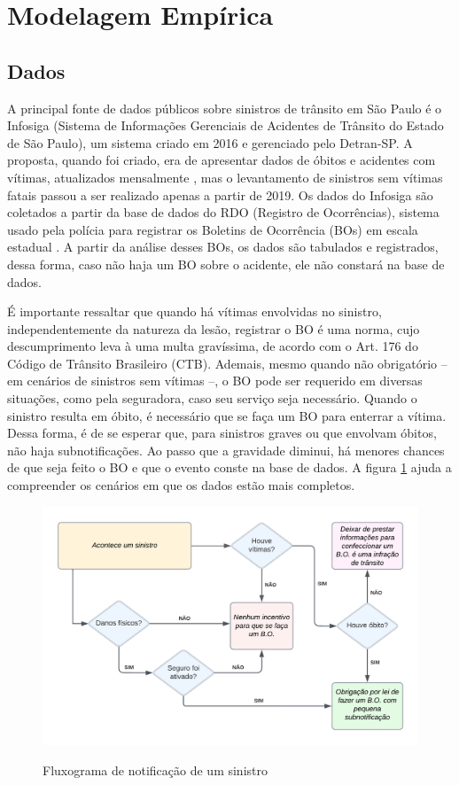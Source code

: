 \section{Modelagem Empírica}
\label{sec:modemp}

\subsection{Dados}

A principal fonte de dados públicos sobre sinistros de trânsito em São Paulo é o Infosiga (Sistema de Informações Gerenciais de Acidentes de Trânsito do Estado de São Paulo), um sistema criado em 2016 e gerenciado pelo Detran-SP. A proposta, quando foi criado, era de apresentar dados de óbitos e acidentes com vítimas, atualizados mensalmente \cite{Res_SG-6_de_23-2-2016}, mas o levantamento de sinistros sem vítimas fatais passou a ser realizado apenas a partir de 2019. Os dados do Infosiga são coletados a partir da base de dados do RDO (Registro de Ocorrências), sistema usado pela polícia para registrar os Boletins de Ocorrência (BOs) em escala estadual \cite{plano_segviar}. A partir da análise desses BOs, os dados são tabulados e registrados, dessa forma, caso não haja um BO sobre o acidente, ele não constará na base de dados. 

É importante ressaltar que quando há vítimas envolvidas no sinistro, independentemente da natureza da lesão, registrar o BO é uma norma, cujo descumprimento leva à uma multa gravíssima, de acordo com o Art. 176 do Código de Trânsito Brasileiro (CTB). Ademais, mesmo quando não obrigatório -- em cenários de sinistros sem vítimas --, o BO pode ser requerido em diversas situações, como pela seguradora, caso seu serviço seja necessário. Quando o sinistro resulta em óbito, é necessário que se faça um BO para enterrar a vítima. Dessa forma, é de se esperar que, para sinistros graves ou que envolvam óbitos, não haja subnotificações. Ao passo que a gravidade diminui, há menores chances de que seja feito o BO e que o evento conste na base de dados. A figura \ref{fig:fluxograma} ajuda a compreender os cenários em que os dados estão mais completos.

\begin{figure}[h]
    \centering
    \caption{Fluxograma de notificação de um sinistro}
    \includegraphics[width = 0.85\linewidth]{relatorios/faixa-azul/figuras/fluxograma.png}
    \label{fig:fluxograma}
\end{figure}

